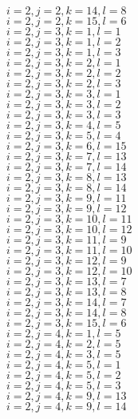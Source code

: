 \documentclass[14pt]{article}
\begin{document}
    $i=2,j=2,k=14,l=8 $ \\ 
    $i=2,j=2,k=15,l=6 $ \\ 
    $i=2,j=3,k=1,l=1 $ \\ 
    $i=2,j=3,k=1,l=2 $ \\ 
    $i=2,j=3,k=1,l=3 $ \\ 
    $i=2,j=3,k=2,l=1 $ \\ 
    $i=2,j=3,k=2,l=2 $ \\ 
    $i=2,j=3,k=2,l=3 $ \\ 
    $i=2,j=3,k=3,l=1 $ \\ 
    $i=2,j=3,k=3,l=2 $ \\ 
    $i=2,j=3,k=3,l=3 $ \\ 
    $i=2,j=3,k=4,l=5 $ \\ 
    $i=2,j=3,k=5,l=4 $ \\ 
    $i=2,j=3,k=6,l=15 $ \\ 
    $i=2,j=3,k=7,l=13 $ \\ 
    $i=2,j=3,k=7,l=14 $ \\ 
    $i=2,j=3,k=8,l=13 $ \\ 
    $i=2,j=3,k=8,l=14 $ \\ 
    $i=2,j=3,k=9,l=11 $ \\ 
    $i=2,j=3,k=9,l=12 $ \\ 
    $i=2,j=3,k=10,l=11 $ \\ 
    $i=2,j=3,k=10,l=12 $ \\ 
    $i=2,j=3,k=11,l=9 $ \\ 
    $i=2,j=3,k=11,l=10 $ \\ 
    $i=2,j=3,k=12,l=9 $ \\ 
    $i=2,j=3,k=12,l=10 $ \\ 
    $i=2,j=3,k=13,l=7 $ \\ 
    $i=2,j=3,k=13,l=8 $ \\ 
    $i=2,j=3,k=14,l=7 $ \\ 
    $i=2,j=3,k=14,l=8 $ \\ 
    $i=2,j=3,k=15,l=6 $ \\ 
    $i=2,j=4,k=1,l=5 $ \\ 
    $i=2,j=4,k=2,l=5 $ \\ 
    $i=2,j=4,k=3,l=5 $ \\ 
    $i=2,j=4,k=5,l=1 $ \\ 
    $i=2,j=4,k=5,l=2 $ \\ 
    $i=2,j=4,k=5,l=3 $ \\ 
    $i=2,j=4,k=9,l=13 $ \\ 
    $i=2,j=4,k=9,l=14 $ \\ 
\end{document}
